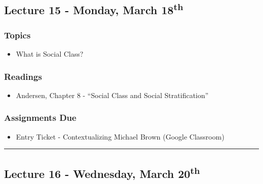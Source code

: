 \documentclass[]{book}
\providecommand{\tightlist}{%
  \setlength{\itemsep}{0pt}\setlength{\parskip}{0pt}}
\begin{document}
\hypertarget{lecture-15---monday-march-18th}{%
\subsection*{\texorpdfstring{Lecture 15 - Monday, March 18\textsuperscript{th}}{Lecture 15 - Monday, March 18th}}\label{lecture-15---monday-march-18th}}

\hypertarget{topics-17}{%
\subsubsection*{Topics}\label{topics-17}}

\begin{itemize}
\tightlist
\item
  What is Social Class?
\end{itemize}

\hypertarget{readings-16}{%
\subsubsection*{Readings}\label{readings-16}}

\begin{itemize}
\tightlist
\item
  Andersen, Chapter 8 - ``Social Class and Social Stratification''
\end{itemize}

\hypertarget{assignments-due-4}{%
\subsubsection*{Assignments Due}\label{assignments-due-4}}

\begin{itemize}
\tightlist
\item
  Entry Ticket - Contextualizing Michael Brown (Google Classroom)
\end{itemize}

\begin{center}\rule{0.5\linewidth}{\linethickness}\end{center}

\hypertarget{lecture-16---wednesday-march-20th}{%
\subsection*{\texorpdfstring{Lecture 16 - Wednesday, March 20\textsuperscript{th}}{Lecture 16 - Wednesday, March 20th}}\label{lecture-16---wednesday-march-20th}}
\end{document}
